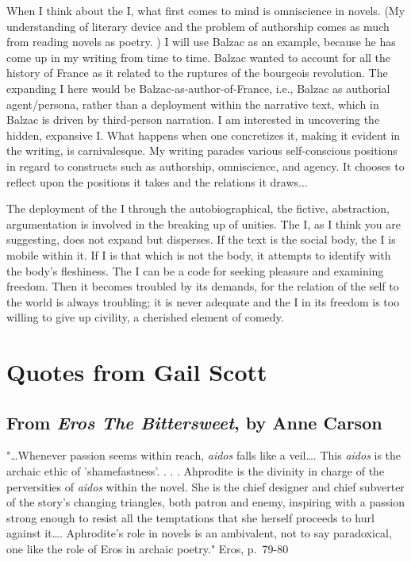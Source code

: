 \documentclass[
]{memoir}
\begin{document}
When I think about the I, what first comes to mind is omniscience in
novels. (My understanding of literary device and the problem of
authorship comes as much from reading novels as poetry. ) I will use
Balzac as an example, because he has come up in my writing from time to
time. Balzac wanted to account for all the history of France as it
related to the ruptures of the bourgeois revolution. The expanding I
here would be Balzac-as-author-of-France, i.e., Balzac as authorial
agent/persona, rather than a deployment within the narrative text, which
in Balzac is driven by third-person narration. I am interested in
uncovering the hidden, expansive I. What happens when one concretizes
it, making it evident in the writing, is carnivalesque. My writing
parades various self-conscious positions in regard to constructs such as
authorship, omniscience, and agency. It chooses to reflect upon the
positions it takes and the relations it draws...

The deployment of the I through the autobiographical, the fictive,
abstraction, argumentation is involved in the breaking up of unities.
The I, as I think you are suggesting, does not expand but disperses. If
the text is the social body, the I is mobile within it. If I is that
which is not the body, it attempts to identify with the body's
fleshiness. The I can be a code for seeking pleasure and examining
freedom. Then it becomes troubled by its demands, for the relation of
the self to the world is always troubling; it is never adequate and the
I in its freedom is too willing to give up civility, a cherished element
of comedy.

\hypertarget{quotes-from-gail-scott}{%
\section*{Quotes from Gail Scott}\label{quotes-from-gail-scott}}

\hypertarget{from-eros-the-bittersweet-by-anne-carson}{%
\subsection*{\texorpdfstring{From \emph{Eros The Bittersweet}, by Anne
Carson}{From Eros The Bittersweet, by Anne Carson}}\label{from-eros-the-bittersweet-by-anne-carson}}

"\ldots{}Whenever passion seems within reach, \emph{aidos} falls like a
veil\ldots{}. This \emph{aidos} is the archaic ethic of 'shamefastness'.
. . . Ahprodite is the divinity in charge of the perversities of
\emph{aidos} within the novel. She is the chief designer and chief
subverter of the story's changing triangles, both patron and enemy,
inspiring with a passion strong enough to resist all the temptations
that she herself proceeds to hurl against it\ldots{}. Aphrodite's role
in novels is an ambivalent, not to say paradoxical, one like the role of
Eros in archaic poetry." Eros, p.~79-80
\end{document}
